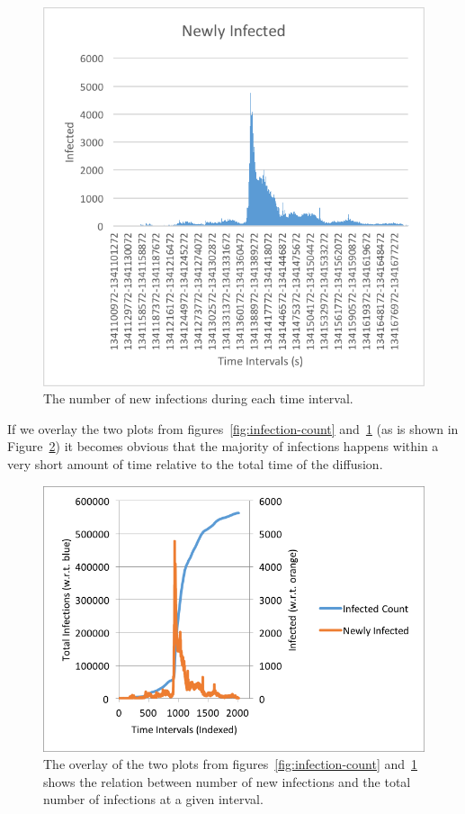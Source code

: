 \documentclass[12pt, oneside, openany]{article} %
\begin{document}
\begin{figure}
\centering
    \includegraphics{newly-infected.png}
    \caption{The number of new infections during each time interval.}
    \label{fig:newly-infected}
\end{figure}

If we overlay the two plots from figures~\ref{fig:infection-count} and~\ref{fig:newly-infected} (as is shown in Figure~\ref{fig:overlay}) it becomes obvious that the majority of infections happens within a very short amount of time relative to the total time of the diffusion.

\begin{figure}
\centering
    \includegraphics{overlay.png}
    \caption{The overlay of the two plots from figures~\ref{fig:infection-count} and~\ref{fig:newly-infected} shows the relation between number of new infections and the total number of infections at a given interval.}
    \label{fig:overlay}
\end{figure}
\end{document}
